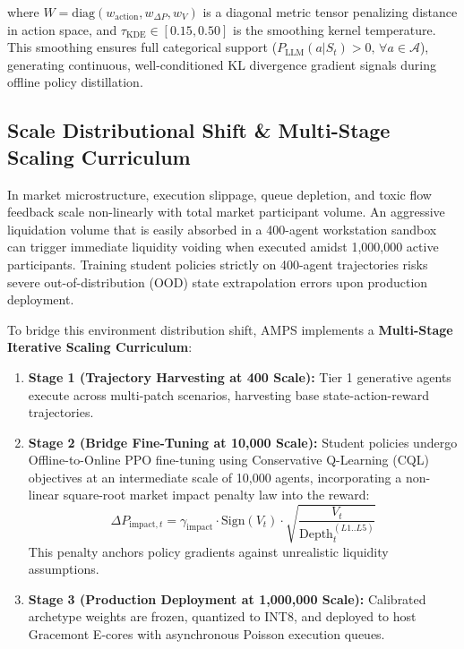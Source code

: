 where $W = \text{diag}(w_{\text{action}}, w_{\Delta P}, w_V)$ is a diagonal metric tensor penalizing distance in action space, and $\tau_{\text{KDE}} \in [0.15, 0.50]$ is the smoothing kernel temperature. This smoothing ensures full categorical support ($P_{\text{LLM}}(a | S_t) > 0, \, \forall a \in \mathcal{A}$), generating continuous, well-conditioned KL divergence gradient signals during offline policy distillation.

\subsection{Scale Distributional Shift \& Multi-Stage Scaling Curriculum}

In market microstructure, execution slippage, queue depletion, and toxic flow feedback scale non-linearly with total market participant volume. An aggressive liquidation volume that is easily absorbed in a 400-agent workstation sandbox can trigger immediate liquidity voiding when executed amidst 1,000,000 active participants. Training student policies strictly on 400-agent trajectories risks severe out-of-distribution (OOD) state extrapolation errors upon production deployment.

To bridge this environment distribution shift, AMPS implements a \textbf{Multi-Stage Iterative Scaling Curriculum}:

\begin{enumerate}
    \item \textbf{Stage 1 (Trajectory Harvesting at 400 Scale):} Tier 1 generative agents execute across multi-patch scenarios, harvesting base state-action-reward trajectories.
    \item \textbf{Stage 2 (Bridge Fine-Tuning at 10,000 Scale):} Student policies undergo Offline-to-Online PPO fine-tuning using Conservative Q-Learning (CQL) objectives at an intermediate scale of 10,000 agents, incorporating a non-linear square-root market impact penalty law into the reward:
    \begin{equation}
        \Delta P_{\text{impact}, t} = \gamma_{\text{impact}} \cdot \text{Sign}(V_t) \cdot \sqrt{\frac{V_t}{\text{Depth}_t^{(L1..L5)}}}
    \end{equation}
    This penalty anchors policy gradients against unrealistic liquidity assumptions.
    \item \textbf{Stage 3 (Production Deployment at 1,000,000 Scale):} Calibrated archetype weights are frozen, quantized to INT8, and deployed to host Gracemont E-cores with asynchronous Poisson execution queues.
\end{enumerate}

